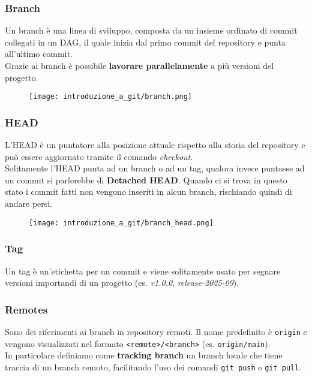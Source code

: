 \documentclass[12pt]{article}
\begin{document}
\subsubsection{Branch}
Un branch è una linea di sviluppo, composta da un insieme ordinato di commit collegati in un DAG, il quale inizia dal primo commit del repository e punta all'ultimo commit.\\
Grazie ai branch è possibile \textbf{lavorare parallelamente} a più versioni del progetto.
\begin{figure}[H]
\centering
\texttt{[image: introduzione\_a\_git/branch.png]}
\end{figure}

\subsubsection{HEAD}
L'HEAD è un puntatore alla posizione attuale rispetto alla storia del repository e può essere aggiornato tramite il comando \textit{checkout}.\\
Solitamente l'HEAD punta ad un branch o ad un tag, qualora invece puntasse ad un commit si parlerebbe di \textbf{Detached HEAD}. Quando ci si trova in questo stato i commit fatti non vengono inseriti in alcun branch, rischiando quindi di andare persi.
\begin{figure}[H]
\centering
\texttt{[image: introduzione\_a\_git/branch\_head.png]}
\end{figure}

\subsubsection{Tag}
Un tag è un'etichetta per un commit e viene solitamente usato per segnare versioni importandi di un progetto (es. \textit{v1.0.0}, \textit{release-2025-09}).

\subsubsection{Remotes}
Sono dei riferimenti ai branch in repository remoti. Il nome predefinito è \texttt{origin} e vengono visualizzati nel formato \texttt{<remote>/<branch>} (es. \texttt{origin/main}).\\
In particolare definiamo come \textbf{tracking branch} un branch locale che tiene traccia di un branch remoto, facilitando l'uso dei comandi \texttt{git push} e \texttt{git pull}.
\end{document}

